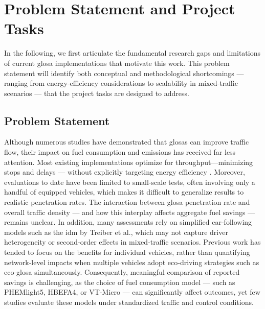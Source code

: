 \section{Problem Statement and Project Tasks}
\label{sec:Problem_Statement_and_Project_Tasks}
In the following, we first articulate the fundamental research gaps and limitations of current \ac{glosa} implementations that motivate this work. This problem statement will identify both conceptual and methodological shortcomings --- ranging from energy‐efficiency considerations to scalability in mixed‐traffic scenarios --- that the project tasks are designed to address.

\subsection{Problem Statement}
\label{subsec:Problem_Statement}
Although numerous studies have demonstrated that \acp{glosa} can improve traffic flow, their impact on fuel consumption and emissions has received far less attention. Most existing implementations optimize for throughput—minimizing stops and delays --- without explicitly targeting energy efficiency \cite{COPPOLA2022103455}. Moreover, evaluations to date have been limited to small‐scale tests, often involving only a handful of equipped vehicles, which makes it difficult to generalize results to realistic penetration rates. The interaction between \ac{glosa} penetration rate and overall traffic density --- and how this interplay affects aggregate fuel savings --- remains unclear. In addition, many assessments rely on simplified car‐following models such as the \ac{idm} by Treiber et al., which may not capture driver heterogeneity or second‐order effects in mixed‐traffic scenarios. Previous work has tended to focus on the benefits for individual vehicles, rather than quantifying network‐level impacts when multiple vehicles adopt eco‐driving strategies such as \ac{eco-glosa} simultaneously. Consequently, meaningful comparison of reported savings is challenging, as the choice of fuel consumption model --- such as PHEMlight5, HBEFA4, or VT-Micro --- can significantly affect outcomes, yet few studies evaluate these models under standardized traffic and control conditions.

